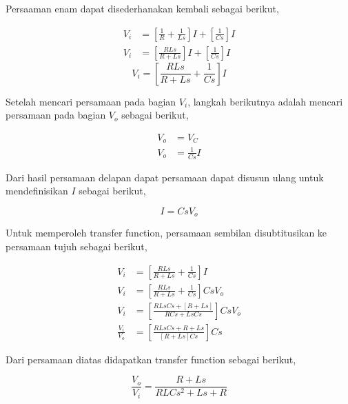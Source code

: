\documentclass[12pt]{journal}
\begin{document}
 Persaaman enam dapat disederhanakan kembali sebagai berikut,
 
 \begin{equation*}
     \begin{split}
         V_i &= [\frac{1}{R}+\frac{1}{Ls}]I+[\frac{1}{Cs}]I \\[5pt]
         V_i &= [\frac{RLs}{R+Ls}]I+[\frac{1}{Cs}]I
     \end{split}
 \end{equation*}
 \begin{equation}
     V_i = [\frac{RLs}{R+Ls}+\frac{1}{Cs}]I
 \end{equation}
 
 Setelah mencari persamaan pada bagian $V_i$, langkah  berikutnya adalah mencari persamaan pada bagian $V_o$ sebagai berikut,
 
 \begin{equation}
     \begin{split}
         V_o &= V_C \\[5pt]
         V_o &= \frac{1}{Cs}I
     \end{split}
 \end{equation}
 
 Dari hasil persamaan delapan dapat persamaan dapat disusun ulang untuk mendefinisikan $I$ sebagai berikut,
 
 \begin{equation}
     I = CsV_o
 \end{equation}
 
 Untuk memperoleh transfer function, persamaan sembilan disubtitusikan ke persamaan 
 tujuh sebagai berikut,
 
 \begin{equation*}
     \begin{split}
         V_i &= [\frac{RLs}{R+Ls}+\frac{1}{Cs}]I \\[5pt]
         V_i &= [\frac{RLs}{R+Ls}+\frac{1}{Cs}]CsV_o \\[5pt]
         V_i &= [\frac{RLsCs+[R+Ls]}{RCs+LsCs}]CsV_o \\[5pt]
         \frac{V_i}{V_o} &= [\frac{RLsCs+R+Ls}{[R+Ls]Cs}]Cs
     \end{split}
 \end{equation*}
 
 Dari persamaan diatas didapatkan transfer function sebagai berikut,
 
 \begin{equation}
     \frac{V_o}{V_i} = \frac{R+Ls}{RLCs^2+Ls+R}
 \end{equation}
 
\end{document}
